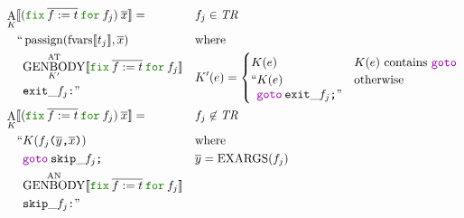 \documentclass[a4paper,fleqn]{article}
\newcommand{\kwfix}{\mbox{\color{mygreen}\ttfamily fix}}
\newcommand{\kwfor}{\mbox{\color{mygreen}\ttfamily for}}
\newcommand{\ofix}[2]{\kwfix\:{#1}\:\kwfor\:{#2}}
\DeclareMathOperator{\EXARGS}{EXARGS}
\newcommand{\BRA}[1]{\llbracket #1 \rrbracket}
\DeclareMathOperator{\genbody}{GENBODY}
\newcommand{\genbodyat}[2]{\genbody^\mathrm{AT}_{#1}\BRA{#2}}
\newcommand{\genbodyan}[1]{\genbody^\mathrm{AN}\BRA{#1}}
\newcommand{\tr}{\mathit{TR}}
\newcommand{\ldq}{\text{``}}
\newcommand{\rdq}{\text{''}}
\newcommand{\ttparen}[1]{\texttt{(}#1\texttt{)}}
\newcommand{\ttsemi}{\texttt{;}}
\newcommand{\ttcomma}{\texttt{,}}
\newcommand{\ttcolon}{\texttt{:}}
\newcommand{\kwgoto}{\mbox{\color{myviolet}\ttfamily goto}}
\DeclareMathOperator{\passign}{passign}
\DeclareMathOperator{\fvarsop}{fvars}
\newcommand{\fvars}[1]{\fvarsop\BRA{#1}}
\DeclareMathOperator{\Aop}{A}
\newcommand{\A}[2]{\Aop_{#1}\BRA{#2}}
\newcommand{\rep}[1]{\overline{#1}}
\begin{document}
\begin{align*}
  &\A{K}{(\ofix{\rep{f:=t}}{f_j})\:\rep{x}} =                   && f_j \in \tr \\
     & \quad\begin{alignedat}[t]{2}
       \ldq & \passign(\fvars{t_j}, \rep{x}) \\
            & {\genbodyat{K'}{\ofix{\rep{f:=t}}{f_j}}} \\
            & \mathtt{exit\_}f_j\ttcolon \rdq
       \end{alignedat} &&
               \begin{alignedat}[t]{1}
                  & \text{where} \\
                  & K'(e) =
                    \begin{cases}
                    K(e) & \text{$K(e)$ contains \kwgoto}  \\
                    \begin{aligned}[t]
                      \ldq & K(e) \\
                           & \kwgoto\:\mathtt{exit\_}f_j\ttsemi \rdq
                    \end{aligned} & \text{otherwise}
                  \end{cases}
                \end{alignedat} \\
  &\A{K}{(\ofix{\rep{f:=t}}{f_j})\:\rep{x}} =                      && f_j \not\in \tr \\
     & \quad\begin{alignedat}[t]{2}
       \ldq & K(f_j\ttparen{\rep{y}\ttcomma \rep{x}})                  \\
            & \kwgoto\:\mathtt{skip\_}f_j\ttsemi                                    \\
            & {\genbodyan{\ofix{\rep{f:=t}}{f_j}}}                          \\
            & \mathtt{skip\_}f_j\ttcolon \rdq
       \end{alignedat} &&
               \begin{alignedat}[t]{1}
                  & \text{where} \\
                  & \rep{y} = \EXARGS(f_j)
               \end{alignedat}
\end{align*}
\end{document}
